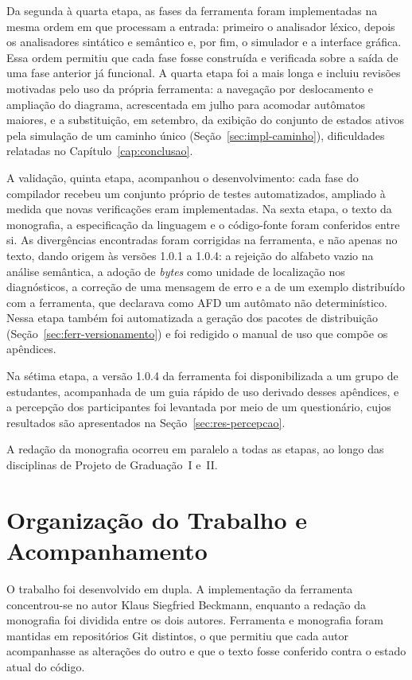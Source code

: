 \documentclass[
    12pt
    ,oneside
    ,a4paper
    ,chapter=TITLE
    ,section=TITLE
    ,sumario=abnt-6027-2012]{abntex2}
\begin{document}
Da segunda à quarta etapa, as fases da ferramenta foram implementadas na mesma ordem em que
processam a entrada: primeiro o analisador léxico, depois os analisadores sintático e
semântico e, por fim, o simulador e a interface gráfica. Essa ordem permitiu que cada fase
fosse construída e verificada sobre a saída de uma fase anterior já funcional. A quarta etapa
foi a mais longa e incluiu revisões motivadas pelo uso da própria ferramenta: a navegação por
deslocamento e ampliação do diagrama, acrescentada em julho para acomodar autômatos maiores, e a
substituição, em setembro, da exibição do conjunto de estados ativos pela simulação de um
caminho único (Seção~\ref{sec:impl-caminho}), dificuldades relatadas no
Capítulo~\ref{cap:conclusao}.

A validação, quinta etapa, acompanhou o desenvolvimento: cada fase do compilador recebeu um
conjunto próprio de testes automatizados, ampliado à medida que novas verificações eram
implementadas. Na sexta etapa, o texto da monografia, a especificação da linguagem e o
código-fonte foram conferidos entre si. As divergências encontradas foram corrigidas na
ferramenta, e não apenas no texto, dando origem às versões 1.0.1 a 1.0.4: a rejeição do
alfabeto vazio na análise semântica, a adoção de \textit{bytes} como unidade de localização
nos diagnósticos, a correção de uma mensagem de erro e a de um exemplo distribuído com a
ferramenta, que declarava como AFD um autômato não determinístico. Nessa etapa também foi automatizada a
geração dos pacotes de distribuição (Seção~\ref{sec:ferr-versionamento}) e foi redigido o
manual de uso que compõe os apêndices.

Na sétima etapa, a versão 1.0.4 da ferramenta foi disponibilizada a um grupo de estudantes,
acompanhada de um guia rápido de uso derivado desses apêndices, e a percepção dos
participantes foi levantada por meio de um questionário, cujos resultados são apresentados
na Seção~\ref{sec:res-percepcao}.

A redação da monografia ocorreu em paralelo a todas as etapas, ao longo das disciplinas de
Projeto de Graduação~I e~II.

\section{Organização do Trabalho e Acompanhamento}
\label{sec:met-organizacao}

O trabalho foi desenvolvido em dupla. A implementação da ferramenta concentrou-se no autor
Klaus Siegfried Beckmann, enquanto a redação da monografia foi dividida entre os dois autores.
Ferramenta e monografia foram mantidas em repositórios Git distintos, o que permitiu que
cada autor acompanhasse as alterações do outro e que o texto fosse conferido contra o
estado atual do código.
\end{document}
